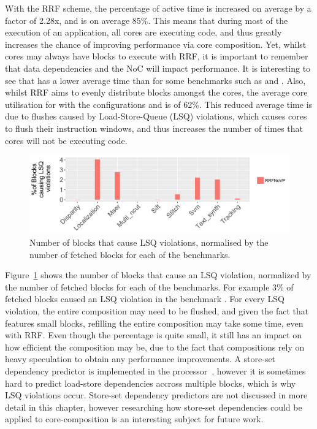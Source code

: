 With the RRF scheme, the percentage of active time is increased on average by a factor of 2.28x, and is on average 85\%.
This means that during most of the execution of an application, all cores are executing code, and thus greatly increases the chance of improving performance via core composition.
Yet, whilst cores may always have blocks to execute with RRF, it is important to remember that data dependencies and the NoC will impact performance.
It is interesting to see that \nfvp{} has a lower average time than \nfnovp{} for some benchmarks such as  and .
Also, whilst RRF aims to evenly distribute blocks amongst the cores, the average core utilisation for  with the configurations \nfnovp{} and \nfvp{} is of 62\%.
This reduced average time is due to flushes caused by Load-Store-Queue (LSQ) violations, which causes cores to flush their instruction windows, and thus increases the number of times that cores will not be executing code.

\begin{figure}[t]
    \centering
    \includegraphics[width=1\textwidth]{chapter3/graphics/lsqViol4.pdf}
    \caption{Number of blocks that cause LSQ violations, normalised by the number of fetched blocks for each of the benchmarks.}
    \label{fig:lsqvio}
	\vspace{1em}
\end{figure}

Figure~\ref{fig:lsqvio} shows the number of blocks that cause an LSQ violation, normalized by the number of fetched blocks for each of the benchmarks.
For example 3\% of fetched blocks caused an LSQ violation in the benchmark .
For every LSQ violation, the entire composition may need to be flushed, and given the fact that  features small blocks, refilling the entire composition may take some time, even with RRF.
Even though the percentage is quite small, it still has an impact on how efficient the composition may be, due to the fact that compositions rely on heavy speculation to obtain any performance improvements.
A store-set dependency predictor is implemented in the processor~\cite{chrysos1998storesets}, however it is sometimes hard to predict load-store dependencies accross multiple blocks, which is why LSQ violations occur.
Store-set dependency predictors are not discussed in more detail in this chapter, however researching how store-set dependencies could be applied to core-composition is an interesting subject for future work.

